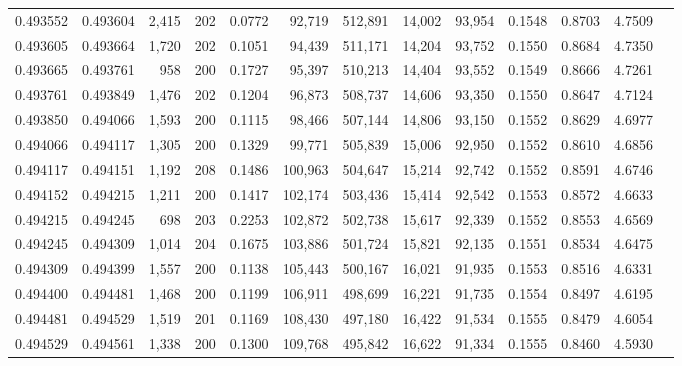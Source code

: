 \begin{tabular}{rrrrrrrrrrrrr}
0.493552 & 0.493604 & 2,415 & 202 &                                     0.0772 &  92,719 & 512,891 &  14,002 &  93,954 & 0.1548 & 0.8703 & 4.7509 \\
0.493605 & 0.493664 & 1,720 & 202 &                                     0.1051 &  94,439 & 511,171 &  14,204 &  93,752 & 0.1550 & 0.8684 & 4.7350 \\
0.493665 & 0.493761 &   958 & 200 &                                     0.1727 &  95,397 & 510,213 &  14,404 &  93,552 & 0.1549 & 0.8666 & 4.7261 \\
0.493761 & 0.493849 & 1,476 & 202 &                                     0.1204 &  96,873 & 508,737 &  14,606 &  93,350 & 0.1550 & 0.8647 & 4.7124 \\
0.493850 & 0.494066 & 1,593 & 200 &                                     0.1115 &  98,466 & 507,144 &  14,806 &  93,150 & 0.1552 & 0.8629 & 4.6977 \\
0.494066 & 0.494117 & 1,305 & 200 &                                     0.1329 &  99,771 & 505,839 &  15,006 &  92,950 & 0.1552 & 0.8610 & 4.6856 \\
0.494117 & 0.494151 & 1,192 & 208 &                                     0.1486 & 100,963 & 504,647 &  15,214 &  92,742 & 0.1552 & 0.8591 & 4.6746 \\
0.494152 & 0.494215 & 1,211 & 200 &                                     0.1417 & 102,174 & 503,436 &  15,414 &  92,542 & 0.1553 & 0.8572 & 4.6633 \\
0.494215 & 0.494245 &   698 & 203 &                                     0.2253 & 102,872 & 502,738 &  15,617 &  92,339 & 0.1552 & 0.8553 & 4.6569 \\
0.494245 & 0.494309 & 1,014 & 204 &                                     0.1675 & 103,886 & 501,724 &  15,821 &  92,135 & 0.1551 & 0.8534 & 4.6475 \\
0.494309 & 0.494399 & 1,557 & 200 &                                     0.1138 & 105,443 & 500,167 &  16,021 &  91,935 & 0.1553 & 0.8516 & 4.6331 \\
0.494400 & 0.494481 & 1,468 & 200 &                                     0.1199 & 106,911 & 498,699 &  16,221 &  91,735 & 0.1554 & 0.8497 & 4.6195 \\
0.494481 & 0.494529 & 1,519 & 201 &                                     0.1169 & 108,430 & 497,180 &  16,422 &  91,534 & 0.1555 & 0.8479 & 4.6054 \\
0.494529 & 0.494561 & 1,338 & 200 &                                     0.1300 & 109,768 & 495,842 &  16,622 &  91,334 & 0.1555 & 0.8460 & 4.5930 \\

\end{tabular}
